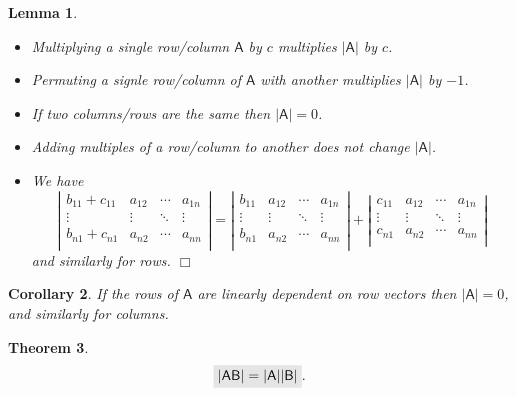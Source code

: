 \documentclass[letter-paper]{tufte-book}
\newtheorem{theorem}{\color{pastel-blue}Theorem}[section]
\newtheorem{lemma}[theorem]{\color{pastel-blue}Lemma}
\newtheorem{corollary}[theorem]{\color{pastel-blue}Corollary}
\newcommand{\As}{{\mathsf{A}}}
\newcommand{\Bs}{{\mathsf{B}}}
\newcommand{\qedwhite}{\hfill \ensuremath{\Box}}
\newcommand{\highlight}[1]{\mathchoice%
  {\colorbox{black!10}{$\displaystyle#1$}}%
  {\colorbox{black!10}{$\textstyle#1$}}%
  {\colorbox{black!10}{$\scriptstyle#1$}}%
  {\colorbox{black!10}{$\scriptscriptstyle#1$}}}%
\begin{document}
\begin{lemma}
  \begin{itemize}
    \item Multiplying a single row/column $\As$ by $c$ multiplies $|\As|$ by $c$.
    \item Permuting a signle row/column of $\As$ with another multiplies $|\As|$ by $-1$.
    \item If two columns/rows are the same then $|\As| = 0$.
    \item Adding multiples of a row/column to another does not change $|\As|$.
    \item We have
    \begin{equation*}
      \left|
      \begin{matrix} 
        b_{11} + c_{11} & a_{12} & \cdots & a_{1n}\\
        \vdots          & \vdots & \ddots & \vdots\\
        b_{n1} + c_{n1} & a_{n2} & \cdots & a_{nn}\\
      \end{matrix}
      \right|
      =
      \left|
      \begin{matrix} 
        b_{11} & a_{12} & \cdots & a_{1n}\\
        \vdots          & \vdots & \ddots & \vdots\\
        b_{n1} & a_{n2} & \cdots & a_{nn}\\
      \end{matrix}
      \right| + 
      \left|
      \begin{matrix} 
        c_{11} & a_{12} & \cdots & a_{1n}\\
        \vdots          & \vdots & \ddots & \vdots\\
        c_{n1} & a_{n2} & \cdots & a_{nn}\\
      \end{matrix}
      \right|
    \end{equation*}
    and similarly for rows. \qedwhite
  \end{itemize}
\end{lemma}

\begin{corollary}
  If the rows of $\As$ are linearly dependent on row vectors then $|\As| = 0$, and similarly for columns.
\end{corollary}

\begin{theorem}\label{thm:det_product}
  \begin{equation}
    \highlight{|\As \Bs| = |\As| |\Bs|}.
  \end{equation}
\end{theorem}
\end{document}
